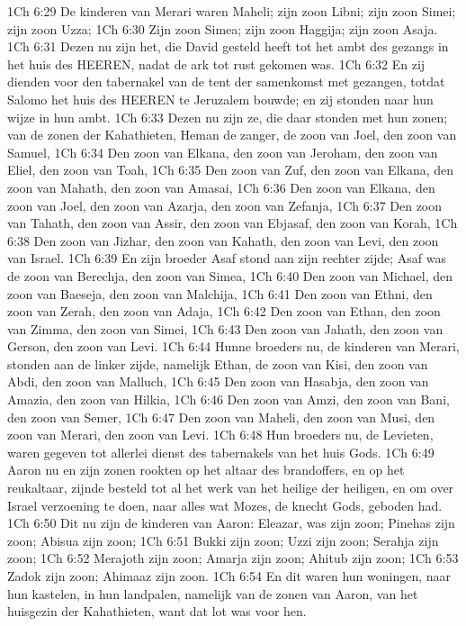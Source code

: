 1Ch 6:29  De kinderen van Merari waren Maheli; zijn zoon Libni; zijn zoon Simei; zijn zoon Uzza;
1Ch 6:30  Zijn zoon Simea; zijn zoon Haggija; zijn zoon Asaja.
1Ch 6:31  Dezen nu zijn het, die David gesteld heeft tot het ambt des gezangs in het huis des HEEREN, nadat de ark tot rust gekomen was.
1Ch 6:32  En zij dienden voor den tabernakel van de tent der samenkomst met gezangen, totdat Salomo het huis des HEEREN te Jeruzalem bouwde; en zij stonden naar hun wijze in hun ambt.
1Ch 6:33  Dezen nu zijn ze, die daar stonden met hun zonen; van de zonen der Kahathieten, Heman de zanger, de zoon van Joel, den zoon van Samuel,
1Ch 6:34  Den zoon van Elkana, den zoon van Jeroham, den zoon van Eliel, den zoon van Toah,
1Ch 6:35  Den zoon van Zuf, den zoon van Elkana, den zoon van Mahath, den zoon van Amasai,
1Ch 6:36  Den zoon van Elkana, den zoon van Joel, den zoon van Azarja, den zoon van Zefanja,
1Ch 6:37  Den zoon van Tahath, den zoon van Assir, den zoon van Ebjasaf, den zoon van Korah,
1Ch 6:38  Den zoon van Jizhar, den zoon van Kahath, den zoon van Levi, den zoon van Israel.
1Ch 6:39  En zijn broeder Asaf stond aan zijn rechter zijde; Asaf was de zoon van Berechja, den zoon van Simea,
1Ch 6:40  Den zoon van Michael, den zoon van Baeseja, den zoon van Malchija,
1Ch 6:41  Den zoon van Ethni, den zoon van Zerah, den zoon van Adaja,
1Ch 6:42  Den zoon van Ethan, den zoon van Zimma, den zoon van Simei,
1Ch 6:43  Den zoon van Jahath, den zoon van Gerson, den zoon van Levi.
1Ch 6:44  Hunne broeders nu, de kinderen van Merari, stonden aan de linker zijde, namelijk Ethan, de zoon van Kisi, den zoon van Abdi, den zoon van Malluch,
1Ch 6:45  Den zoon van Hasabja, den zoon van Amazia, den zoon van Hilkia,
1Ch 6:46  Den zoon van Amzi, den zoon van Bani, den zoon van Semer,
1Ch 6:47  Den zoon van Maheli, den zoon van Musi, den zoon van Merari, den zoon van Levi.
1Ch 6:48  Hun broeders nu, de Levieten, waren gegeven tot allerlei dienst des tabernakels van het huis Gods.
1Ch 6:49  Aaron nu en zijn zonen rookten op het altaar des brandoffers, en op het reukaltaar, zijnde besteld tot al het werk van het heilige der heiligen, en om over Israel verzoening te doen, naar alles wat Mozes, de knecht Gods, geboden had.
1Ch 6:50  Dit nu zijn de kinderen van Aaron: Eleazar, was zijn zoon; Pinehas zijn zoon; Abisua zijn zoon;
1Ch 6:51  Bukki zijn zoon; Uzzi zijn zoon; Serahja zijn zoon;
1Ch 6:52  Merajoth zijn zoon; Amarja zijn zoon; Ahitub zijn zoon;
1Ch 6:53  Zadok zijn zoon; Ahimaaz zijn zoon.
1Ch 6:54  En dit waren hun woningen, naar hun kastelen, in hun landpalen, namelijk van de zonen van Aaron, van het huisgezin der Kahathieten, want dat lot was voor hen.
